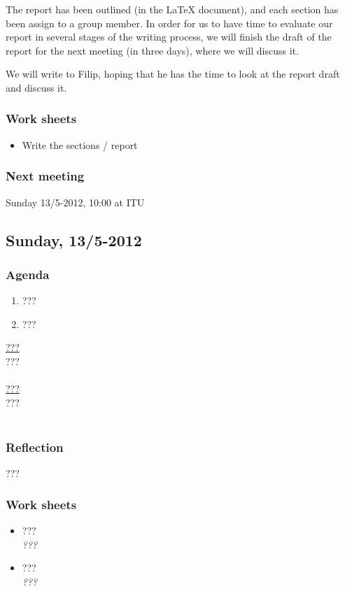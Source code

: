 \documentclass[a4paper,11pt]{article}
\begin{document}
The report has been outlined (in the LaTeX document), and each section has been assign to a group member. In order for us to have time to evaluate our report in several stages of the writing process, we will finish the draft of the report for the next meeting (in three days), where we will discuss it.

We will write to Filip, hoping that he has the time to look at the report draft and discuss it.

\subsubsection*{Work sheets}
\begin{itemize}
	\item Write the sections / report
\end{itemize}

\subsubsection*{Next meeting}
Sunday 13/5-2012, 10:00 at ITU

\pagebreak
\subsection{Sunday, 13/5-2012}

\subsubsection*{Agenda}
\begin{enumerate}
	\item ???
	\item ???
\end{enumerate}
\underline{???} \\
??? \\ \\
\underline{???} \\
??? \\ \\

\subsubsection*{Reflection}
???

\subsubsection*{Work sheets}
\begin{itemize}
	\item ??? \\
		\textsl{???}
	\item ??? \\
		\textsl{???}
\end{itemize}
\end{document}
